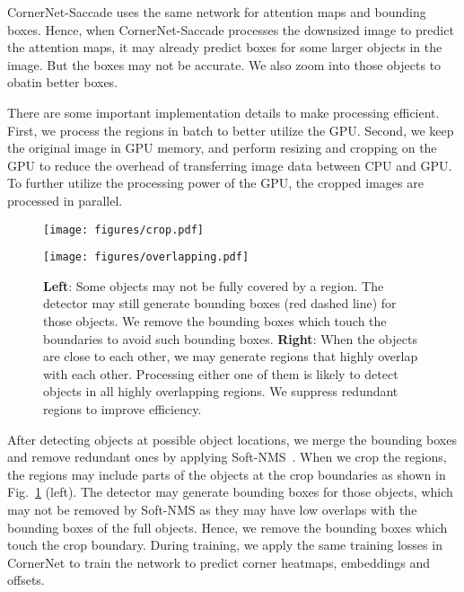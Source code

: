 \documentclass{bmvc2k}
\begin{document}
CornerNet-Saccade uses the same network for attention maps and bounding boxes. Hence, when CornerNet-Saccade processes the downsized image to predict the attention maps, it may already predict boxes for some larger objects in the image. But the boxes may not be accurate. We also zoom into those objects to obatin better boxes.

There are some important implementation details to make processing efficient. First, we process the regions in batch to better utilize the GPU. Second, we keep the original image in GPU memory, and perform resizing and cropping on the GPU to reduce the overhead of transferring image data between CPU and GPU. To further utilize the processing power of the GPU, the cropped images are processed in parallel.

\begin{figure}[t]
    \centering
    \begin{minipage}[t]{0.47\textwidth}
        \centering
        \texttt{[image: figures/crop.pdf]}
    \end{minipage}
    \hfill
    \begin{minipage}[t]{0.51\textwidth}
        \centering
        \texttt{[image: figures/overlapping.pdf]}
    \end{minipage}
    \caption{\textbf{Left}: Some objects may not be fully covered by a region. The detector may still generate bounding boxes (red dashed line) for those objects. We remove the bounding boxes which touch the boundaries to avoid such bounding boxes. \textbf{Right}: When the objects are close to each other, we may generate regions that highly overlap with each other. Processing either one of them is likely to detect objects in all highly overlapping regions. We suppress redundant regions to improve efficiency.}
    \label{fig:crop_and_overlap}
    \vspace{-3mm}
\end{figure}

After detecting objects at possible object locations, we merge the bounding boxes and remove redundant ones by applying Soft-NMS~\cite{bodla2017soft}. When we crop the regions, the regions may include parts of the objects at the crop boundaries as shown in Fig.~\ref{fig:crop_and_overlap} (left). The detector may generate bounding boxes for those objects, which may not be removed by Soft-NMS as they may have low overlaps with the bounding boxes of the full objects. Hence, we remove the bounding boxes which touch the crop boundary. During training, we apply the same training losses in CornerNet to train the network to predict corner heatmaps, embeddings and offsets.
\end{document}
